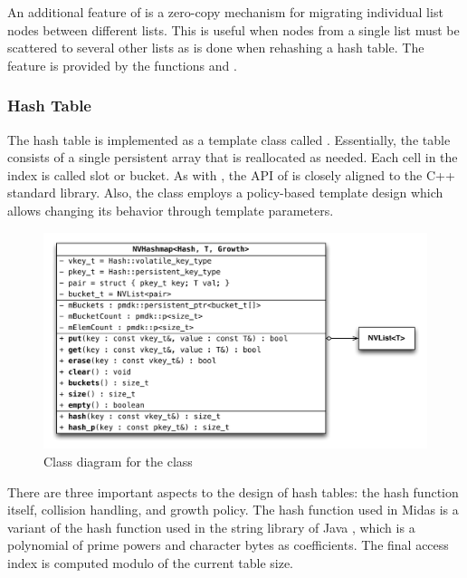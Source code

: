 An additional feature of  is a zero-copy mechanism for migrating
individual list nodes between different lists. This is useful when nodes from a
single list must be scattered to several other lists as is done when rehashing a
hash table. The feature is provided by the functions 
and .

\subsubsection{Hash Table}

The hash table is implemented as a template class called .
Essentially, the table consists of a single persistent array that is reallocated
as needed. Each cell in the index is called slot or bucket. As with
, the API of  is closely aligned to the C++
standard library. Also, the class employs a policy-based template design which
allows changing its behavior through template parameters.

\begin{figure}[h!]
    \centering
    \includegraphics[scale=0.66]{figures/impl/map.pdf}
    \caption{Class diagram for the class }
    \label{fig:impl-map}
\end{figure}

There are three important aspects to the design of hash tables: the hash
function itself, collision handling, and growth policy. The hash function used
in Midas is a variant of the hash function used in the string library of Java
\cite{javadoc2018hashcode}, which is a polynomial of prime powers and character
bytes as coefficients. The final access index is computed modulo of the current
table size.

